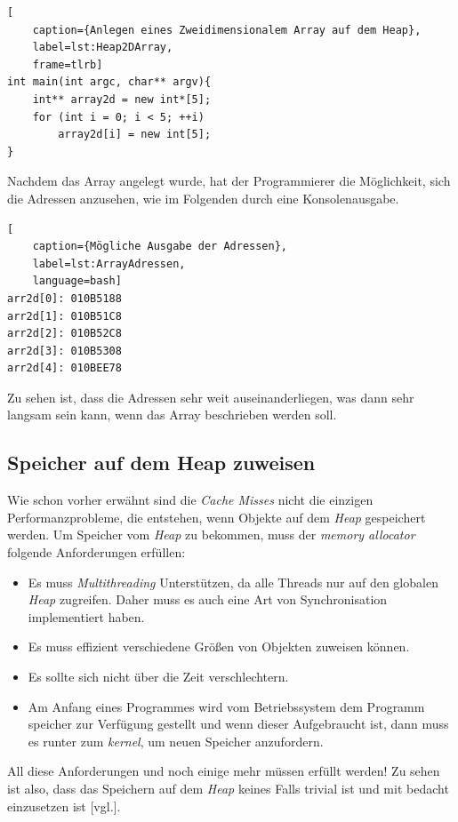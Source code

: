 \begin{lstlisting}[
    caption={Anlegen eines Zweidimensionalem Array auf dem Heap},
    label=lst:Heap2DArray,
    frame=tlrb]
int main(int argc, char** argv){
	int** array2d = new int*[5];
	for (int i = 0; i < 5; ++i)
		array2d[i] = new int[5];
}
\end{lstlisting}

Nachdem das Array angelegt wurde, hat der Programmierer die Möglichkeit, sich die Adressen
anzusehen, wie im Folgenden durch eine Konsolenausgabe.

\begin{lstlisting}[
    caption={Mögliche Ausgabe der Adressen},
    label=lst:ArrayAdressen,
    language=bash]
arr2d[0]: 010B5188
arr2d[1]: 010B51C8
arr2d[2]: 010B52C8
arr2d[3]: 010B5308
arr2d[4]: 010BEE78
\end{lstlisting}

Zu sehen ist, dass die Adressen sehr weit auseinanderliegen, was dann sehr langsam sein kann,
wenn das Array beschrieben werden soll.

\subsection{Speicher auf dem Heap zuweisen}
Wie schon vorher erwähnt sind die \emph{Cache Misses} nicht die einzigen Performanzprobleme, die
entstehen, wenn Objekte auf dem \emph{Heap} gespeichert werden. Um Speicher vom \emph{Heap} zu
bekommen, muss der \emph{memory allocator} folgende Anforderungen erfüllen:

\begin{itemize}
    \item Es muss \emph{Multithreading} Unterstützen, da alle Threads nur auf den globalen
    \emph{Heap} zugreifen. Daher muss es auch eine Art von Synchronisation implementiert haben.
    \item Es muss effizient verschiedene Größen von Objekten zuweisen können.
    \item Es sollte sich nicht über die Zeit verschlechtern.
    \item Am Anfang eines Programmes wird vom Betriebssystem dem Programm speicher zur Verfügung
     gestellt und wenn dieser Aufgebraucht ist, dann muss es runter zum \emph{kernel}, um
     neuen Speicher anzufordern.
\end{itemize}

All diese Anforderungen und noch einige mehr müssen erfüllt werden! Zu sehen ist also, dass das
Speichern auf dem \emph{Heap} keines Falls trivial ist und mit bedacht einzusetzen ist
\cite{HandsOn}[vgl.].

